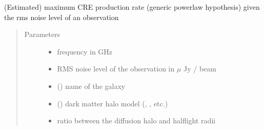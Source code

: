 \documentclass[letterpaper,10pt,english]{sphinxmanual}
\begin{document}
\begin{fulllineitems}
\label{\detokenize{diffsph:diffsph.limits.generic_rate_limest}}
\sphinxAtStartPar
(Estimated) maximum CRE production rate (generic power\sphinxhyphen{}law hypothesis) given the rms noise level of an observation
\begin{quote}\begin{description}
\item[{Parameters}] \leavevmode\begin{itemize}
\item {} 
\sphinxAtStartPar
{} \textendash{} frequency in GHz

\item {} 
\sphinxAtStartPar
{} \textendash{} RMS noise level of the observation in \(\mu\) Jy / beam

\item {} 
\sphinxAtStartPar
{} () \textendash{} name of the galaxy

\item {} 
\sphinxAtStartPar
{} () \textendash{} dark matter halo model (, , etc.)

\item {} 
\sphinxAtStartPar
{} \textendash{} ratio between the diffusion halo and half\sphinxhyphen{}light radii


\end{itemize}
\end{description}
\end{quote}
\end{fulllineitems}
\end{document}
